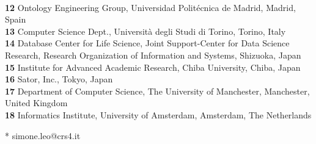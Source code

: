 \documentclass[10pt,letterpaper]{article}
\begin{document}
\begin{flushleft}
\\
\textbf{12} Ontology Engineering Group, Universidad Politécnica de Madrid, Madrid, Spain
\\
\textbf{13} Computer Science Dept., Università degli Studi di Torino, Torino, Italy
\\
\textbf{14} Database Center for Life Science, Joint Support-Center for Data Science Research, Research Organization of Information and Systems, Shizuoka, Japan
\\
\textbf{15} Institute for Advanced Academic Research, Chiba University, Chiba, Japan
\\
\textbf{16} Sator, Inc., Tokyo, Japan
\\
\textbf{17} Department of Computer Science, The University of Manchester, Manchester, United Kingdom
\\
\textbf{18} Informatics Institute, University of Amsterdam, Amsterdam, The Netherlands
\\
\bigskip

% 
%





* simone.leo@crs4.it

\end{flushleft}
\end{document}
